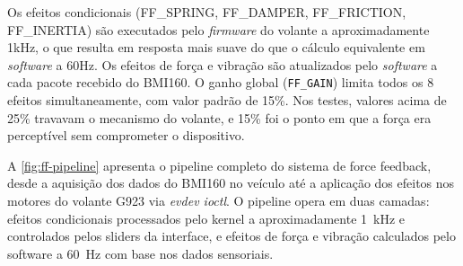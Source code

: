 \begin{table}[!h]
\captionsetup{width=16cm}
\end{table}

Os efeitos condicionais (FF\_SPRING, FF\_DAMPER, FF\_FRICTION, FF\_INERTIA) são executados pelo \textit{firmware} do volante a aproximadamente 1kHz, o que resulta em resposta mais suave do que o cálculo equivalente em \textit{software} a 60Hz. Os efeitos de força e vibração são atualizados pelo \textit{software} a cada pacote recebido do BMI160. O ganho global (\texttt{FF\_GAIN}) limita todos os 8 efeitos simultaneamente, com valor padrão de 15\%. Nos testes, valores acima de 25\% travavam o mecanismo do volante, e 15\% foi o ponto em que a força era perceptível sem comprometer o dispositivo.

A \autoref{fig:ff-pipeline} apresenta o pipeline completo do sistema de force feedback, desde a aquisição dos dados do BMI160 no veículo até a aplicação dos efeitos nos motores do volante G923 via \textit{evdev ioctl}. O pipeline opera em duas camadas: efeitos condicionais processados pelo kernel a aproximadamente 1~kHz e controlados pelos sliders da interface, e efeitos de força e vibração calculados pelo software a 60~Hz com base nos dados sensoriais.

